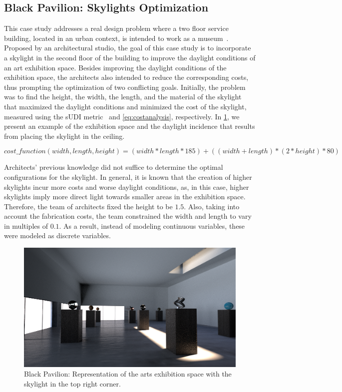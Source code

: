 \subsection{Black Pavilion: Skylights Optimization}
This case study addresses a real design problem where a two floor service building, located in an urban context, is intended to work as a museum~\cite{Caetano2018,IP2019MOO}. Proposed by an architectural studio, the goal of this case study is to incorporate a skylight in the second floor of the building to improve the daylight conditions of an art exhibition space. Besides improving the daylight conditions of the exhibition space, the architects also intended to reduce the corresponding costs, thus prompting the optimization of two conflicting goals. Initially, the problem was to find the height, the width, the length, and the material of the skylight that maximized the daylight conditions and minimized the cost of the skylight, measured using the \ac{sUDI} metric~\cite{Nabil2006} and \cref{eq:costanalysis}, respectively. In \cref{fig:blackpavilion}, we present an example of the exhibition space and the daylight incidence that results from placing the skylight in the ceiling.

\begin{equation} \label{eq:costanalysis}
cost\_function(width, length, height) = (width * length * 185) + ((width + length) * ( 2 * height) * 80)
\end{equation}

Architects' previous knowledge did not suffice to determine the optimal configurations for the skylight. In general, it is known that the creation of higher skylights incur more costs and worse daylight conditions, as, in this case, higher skylights imply more direct light towards smaller areas in the exhibition space. Therefore, the team of architects fixed the height to be $1.5$\metre. Also, taking into account the fabrication costs, the team constrained the width and length to vary in multiples of $0.1$\metre. As a result, instead of modeling continuous variables, these were modeled as discrete variables.

\begin{figure}[htbp]
	\centering
	\includegraphics[width=\textwidth]{Images/Evaluation/BlackPavilion/PavPretoExample116x7204.png}
	\caption[Black Pavilion: Representation of the arts exhibition space with a skylight]{Black Pavilion: Representation of the arts exhibition space with the skylight in the top right corner.}
	\label{fig:blackpavilion}
\end{figure}

